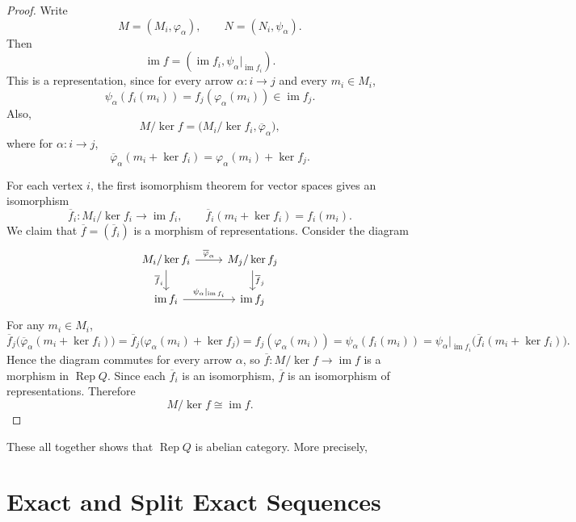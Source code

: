 \documentclass[11pt, a4paper]{report}
\begin{document}
\begin{proof} 
Write
\[
M=(M_i,\varphi_\alpha), \qquad N=(N_i,\psi_\alpha).
\]
Then
\[
\operatorname{im}f=(\operatorname{im}f_i,\psi_\alpha|_{\operatorname{im}f_i}).
\]
This is a representation, since for every arrow $\alpha:i\to j$ and every $m_i\in M_i$,
\[
\psi_\alpha(f_i(m_i))=f_j(\varphi_\alpha(m_i))\in \operatorname{im}f_j.
\]
Also,
\[
M/\operatorname{ker}f=\bigl(M_i/\operatorname{ker}f_i,\overline{\varphi}_\alpha\bigr),
\]
where for $\alpha:i\to j$,
\[
\overline{\varphi}_\alpha(m_i+\operatorname{ker}f_i)=\varphi_\alpha(m_i)+\operatorname{ker}f_j.
\]

For each vertex $i$, the first isomorphism theorem for vector spaces gives an isomorphism
\[
\overline{f}_i:M_i/\operatorname{ker}f_i\longrightarrow \operatorname{im}f_i,
\qquad
\overline{f}_i(m_i+\operatorname{ker}f_i)=f_i(m_i).
\]
We claim that $\overline{f}=(\overline{f}_i)$ is a morphism of representations. Consider the diagram
\[
\begin{tikzcd}
M_i/\operatorname{ker}f_i \arrow[r, "\overline{\varphi}_\alpha"] \arrow[d, "\overline{f}_i"'] & M_j/\operatorname{ker}f_j \arrow[d, "\overline{f}_j"] \\
\operatorname{im}f_i \arrow[r, "\psi_\alpha|_{\operatorname{im}f_i}"] & \operatorname{im}f_j
\end{tikzcd}
\]
For any $m_i\in M_i$,
\[
\overline{f}_j\bigl(\overline{\varphi}_\alpha(m_i+\operatorname{ker}f_i)\bigr)
=\overline{f}_j\bigl(\varphi_\alpha(m_i)+\operatorname{ker}f_j\bigr)
=f_j(\varphi_\alpha(m_i))
=\psi_\alpha(f_i(m_i))
=\psi_\alpha|_{\operatorname{im}f_i}\bigl(\overline{f}_i(m_i+\operatorname{ker}f_i)\bigr).
\]
Hence the diagram commutes for every arrow $\alpha$, so $\overline{f}:M/\operatorname{ker}f\to \operatorname{im}f$ is a morphism in $\operatorname{Rep}Q$. Since each $\overline{f}_i$ is an isomorphism, $\overline{f}$ is an isomorphism of representations. Therefore
\[
M/\operatorname{ker}f\cong \operatorname{im}f.
\]
\end{proof}

These all together shows that $ \operatorname{Rep}Q $ is abelian category. More precisely,

\section{Exact and Split Exact Sequences}
\end{document}
